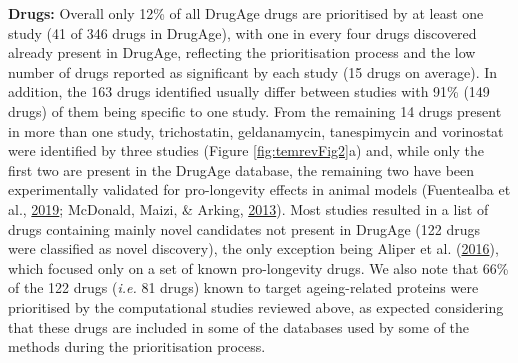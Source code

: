 \documentclass[12pt,twoside]{unicam}
\begin{document}
\textbf{Drugs:} Overall only 12\% of all DrugAge drugs are prioritised by at least one study (41 of 346 drugs in DrugAge), with one in every four drugs discovered already present in DrugAge, reflecting the prioritisation process and the low number of drugs reported as significant by each study (15 drugs on average). In addition, the 163 drugs identified usually differ between studies with 91\% (149 drugs) of them being specific to one study. From the remaining 14 drugs present in more than one study, trichostatin, geldanamycin, tanespimycin and vorinostat were identified by three studies (Figure \ref{fig:temrevFig2}a) and, while only the first two are present in the DrugAge database, the remaining two have been experimentally validated for pro-longevity effects in animal models (Fuentealba et al., \protect\hyperlink{ref-Fuentealba2019}{2019}; McDonald, Maizi, \& Arking, \protect\hyperlink{ref-McDonald2013}{2013}). Most studies resulted in a list of drugs containing mainly novel candidates not present in DrugAge (122 drugs were classified as novel discovery), the only exception being Aliper et al. (\protect\hyperlink{ref-Aliper2016}{2016}), which focused only on a set of known pro-longevity drugs. We also note that 66\% of the 122 drugs (\emph{i.e.} 81 drugs) known to target ageing-related proteins were prioritised by the computational studies reviewed above, as expected considering that these drugs are included in some of the databases used by some of the methods during the prioritisation process.
\end{document}
